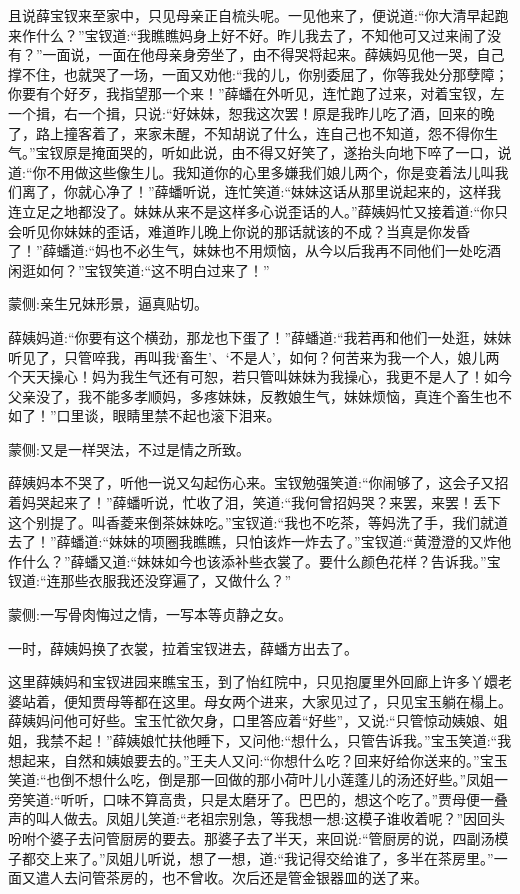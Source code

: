 \begin{parag}
    且说薛宝钗来至家中，只见母亲正自梳头呢。一见他来了，便说道:“你大清早起跑来作什么？”宝钗道:“我瞧瞧妈身上好不好。昨儿我去了，不知他可又过来闹了没有？”一面说，一面在他母亲身旁坐了，由不得哭将起来。薛姨妈见他一哭，自己撑不住，也就哭了一场，一面又劝他:“我的儿，你别委屈了，你等我处分那孽障；你要有个好歹，我指望那一个来！”薛蟠在外听见，连忙跑了过来，对着宝钗，左一个揖，右一个揖，只说:“好妹妹，恕我这次罢！原是我昨儿吃了酒，回来的晚了，路上撞客着了，来家未醒，不知胡说了什么，连自己也不知道，怨不得你生气。”宝钗原是掩面哭的，听如此说，由不得又好笑了，遂抬头向地下啐了一口，说道:“你不用做这些像生儿。我知道你的心里多嫌我们娘儿两个，你是变着法儿叫我们离了，你就心净了！”薛蟠听说，连忙笑道:“妹妹这话从那里说起来的，这样我连立足之地都没了。妹妹从来不是这样多心说歪话的人。”薛姨妈忙又接着道:“你只会听见你妹妹的歪话，难道昨儿晚上你说的那话就该的不成？当真是你发昏了！”薛蟠道:“妈也不必生气，妹妹也不用烦恼，从今以后我再不同他们一处吃酒闲逛如何？”宝钗笑道:“这不明白过来了！”\begin{note}蒙侧:亲生兄妹形景，逼真贴切。\end{note}薛姨妈道:“你要有这个横劲，那龙也下蛋了！”薛蟠道:“我若再和他们一处逛，妹妹听见了，只管啐我，再叫我‘畜生’、‘不是人’，如何？何苦来为我一个人，娘儿两个天天操心！妈为我生气还有可恕，若只管叫妹妹为我操心，我更不是人了！如今父亲没了，我不能多孝顺妈，多疼妹妹，反教娘生气，妹妹烦恼，真连个畜生也不如了！”口里谈，眼睛里禁不起也滚下泪来。\begin{note}蒙侧:又是一样哭法，不过是情之所致。\end{note}薛姨妈本不哭了，听他一说又勾起伤心来。宝钗勉强笑道:“你闹够了，这会子又招着妈哭起来了！”薛蟠听说，忙收了泪，笑道:“我何曾招妈哭？来罢，来罢！丢下这个别提了。叫香菱来倒茶妹妹吃。”宝钗道:“我也不吃茶，等妈洗了手，我们就道去了！”薛蟠道:“妹妹的项圈我瞧瞧，只怕该炸一炸去了。”宝钗道:“黄澄澄的又炸他作什么？”薛蟠又道:“妹妹如今也该添补些衣裳了。要什么颜色花样？告诉我。”宝钗道:“连那些衣服我还没穿遍了，又做什么？”\begin{note}蒙侧:一写骨肉悔过之情，一写本等贞静之女。\end{note}一时，薛姨妈换了衣裳，拉着宝钗进去，薛蟠方出去了。
\end{parag}


\begin{parag}
    这里薛姨妈和宝钗进园来瞧宝玉，到了怡红院中，只见抱厦里外回廊上许多丫嬛老婆站着，便知贾母等都在这里。母女两个进来，大家见过了，只见宝玉躺在榻上。薛姨妈问他可好些。宝玉忙欲欠身，口里答应着“好些”，又说:“只管惊动姨娘、姐姐，我禁不起！”薛姨娘忙扶他睡下，又问他:“想什么，只管告诉我。”宝玉笑道:“我想起来，自然和姨娘要去的。”王夫人又问:“你想什么吃？回来好给你送来的。”宝玉笑道:“也倒不想什么吃，倒是那一回做的那小荷叶儿小莲蓬儿的汤还好些。”凤姐一旁笑道:“听听，口味不算高贵，只是太磨牙了。巴巴的，想这个吃了。”贾母便一叠声的叫人做去。凤姐儿笑道:“老祖宗别急，等我想一想:这模子谁收着呢？”因回头吩咐个婆子去问管厨房的要去。那婆子去了半天，来回说:“管厨房的说，四副汤模子都交上来了。”凤姐儿听说，想了一想，道:“我记得交给谁了，多半在茶房里。”一面又遣人去问管茶房的，也不曾收。次后还是管金银器皿的送了来。
\end{parag}


